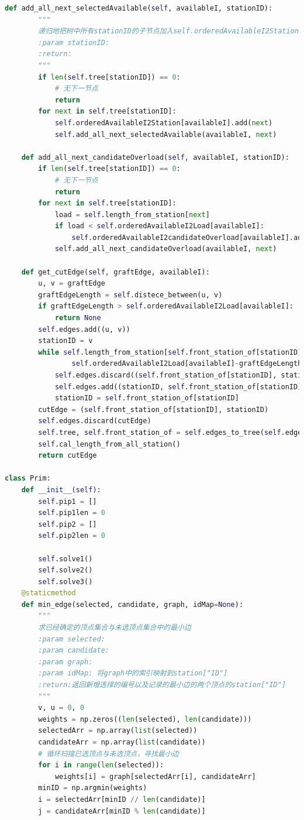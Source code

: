 \documentclass{cumcmthesis}
\begin{document}
\begin{appendices}
\begin{lstlisting}[language=python]
    def add_all_next_selectedAvailable(self, availableI, stationID):
        """
        递归地把树中所有stationID的子节点加入self.orderedAvailableI2Station[]
        :param stationID:
        :return:
        """
        if len(self.tree[stationID]) == 0:
            # 无下一节点
            return
        for next in self.tree[stationID]:
            self.orderedAvailableI2Station[availableI].add(next)
            self.add_all_next_selectedAvailable(availableI, next)

    def add_all_next_candidateOverload(self, availableI, stationID):
        if len(self.tree[stationID]) == 0:
            # 无下一节点
            return
        for next in self.tree[stationID]:
            load = self.length_from_station[next]
            if load < self.orderedAvailableI2Load[availableI]:
                self.orderedAvailableI2candidateOverload[availableI].add(next)
            self.add_all_next_candidateOverload(availableI, next)

    def get_cutEdge(self, graftEdge, availableI):
        u, v = graftEdge
        graftEdgeLength = self.distece_between(u, v)
        if graftEdgeLength > self.orderedAvailableI2Load[availableI]:
            return None
        self.edges.add((u, v))
        stationID = v
        while self.length_from_station[self.front_station_of[stationID]] < \
                self.orderedAvailableI2Load[availableI]-graftEdgeLength:
            self.edges.discard((self.front_station_of[stationID], stationID))
            self.edges.add((stationID, self.front_station_of[stationID]))
            stationID = self.front_station_of[stationID]
        cutEdge = (self.front_station_of[stationID], stationID)
        self.edges.discard(cutEdge)
        self.tree, self.front_station_of = self.edges_to_tree(self.edges)
        self.cal_length_from_all_station()
        return cutEdge

class Prim:
    def __init__(self):
        self.pip1 = []
        self.pip1len = 0
        self.pip2 = []
        self.pip2len = 0

        self.solve1()
        self.solve2()
        self.solve3()
    @staticmethod
    def min_edge(selected, candidate, graph, idMap=None):
        """
        求已经确定的顶点集合与未选顶点集合中的最小边
        :param selected:
        :param candidate:
        :param graph:
        :param idMap: 将graph中的索引映射到station["ID"]
        :return:返回新增选择的编号以及记录的最小边的两个顶点的station["ID"]
        """
        v, u = 0, 0
        weights = np.zeros((len(selected), len(candidate)))
        selectedArr = np.array(list(selected))
        candidateArr = np.array(list(candidate))
        # 循环扫描已选顶点与未选顶点，寻找最小边
        for i in range(len(selected)):
            weights[i] = graph[selectedArr[i], candidateArr]
        minID = np.argmin(weights)
        i = selectedArr[minID // len(candidate)]
        j = candidateArr[minID % len(candidate)]


\end{lstlisting}
\end{appendices}
\end{document}
